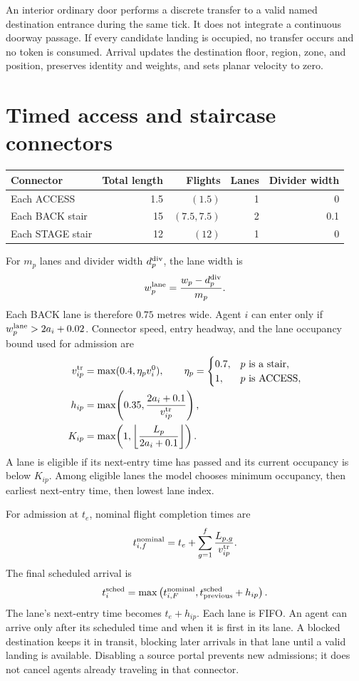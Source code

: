 \documentclass[11pt]{article}
\begin{document}
An interior ordinary door performs a discrete transfer to a valid named
destination entrance during the same tick. It does not integrate a continuous
doorway passage. If every candidate landing is occupied, no transfer occurs
and no token is consumed. Arrival updates the destination floor, region, zone,
and position, preserves identity and weights, and sets planar velocity to zero.

\section{Timed access and staircase connectors}

\begin{center}
\begin{tabular}{lrrrr}
\toprule
Connector & Total length & Flights & Lanes & Divider width\\
\midrule
Each ACCESS & 1.5 & $(1.5)$ & 1 & 0\\
Each BACK stair & 15 & $(7.5,7.5)$ & 2 & 0.1\\
Each STAGE stair & 12 & $(12)$ & 1 & 0\\
\bottomrule
\end{tabular}
\end{center}

For $m_p$ lanes and divider width $d_p^{\rm div}$, the lane width is
\[
 w_p^{\rm lane}=\frac{w_p-d_p^{\rm div}}{m_p}.
\]
Each BACK lane is therefore $0.75$ metres wide. Agent $i$ can enter only if
$w_p^{\rm lane}>2a_i+0.02$. Connector speed, entry headway, and the lane
occupancy bound used for admission are
\begin{align}
 v_{ip}^{\rm tr}&=\max(0.4,\eta_p v_i^0),\qquad
 \eta_p=\begin{cases}0.7,&p\text{ is a stair},\\1,&p\text{ is ACCESS},\end{cases}\\
 h_{ip}&=\max\!\left(0.35,\frac{2a_i+0.1}{v_{ip}^{\rm tr}}\right),\\
 K_{ip}&=\max\!\left(1,\left\lfloor\frac{L_p}{2a_i+0.1}\right\rfloor\right).
\end{align}
A lane is eligible if its next-entry time has passed and its current occupancy
is below $K_{ip}$. Among eligible lanes the model chooses minimum occupancy,
then earliest next-entry time, then lowest lane index.

For admission at $t_e$, nominal flight completion times are
\[
 t_{i,f}^{\rm nominal}=t_e+
       \sum_{g=1}^{f}\frac{L_{p,g}}{v_{ip}^{\rm tr}}.
\]
The final scheduled arrival is
\[
 t_i^{\rm sched}=\max\left(t_{i,F}^{\rm nominal},
                        t_{\rm previous}^{\rm sched}+h_{ip}\right).
\]
The lane's next-entry time becomes $t_e+h_{ip}$. Each lane is FIFO. An agent
can arrive only after its scheduled time and when it is first in its lane.
A blocked destination keeps it in transit, blocking later arrivals in that
lane until a valid landing is available. Disabling a source portal prevents
new admissions; it does not cancel agents already traveling in that connector.
\end{document}
